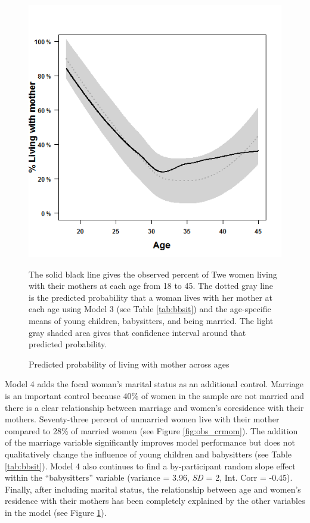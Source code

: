 \documentclass[10pt]{article}
\begin{document}
\begin{figure}[!tb]
    \centering
    \includegraphics[scale=.55]{images/babysit}
\caption{Predicted probability of living with mother across ages \label{fig:bbsit_fig} }
\medskip
The solid black line gives the observed percent of Twe women living with their mothers at each age from 18 to 45.  The dotted gray line is the predicted probability that a woman lives with her mother at each age using Model 3 (see Table \ref{tab:bbsit}) and the age-specific means of young children, babysitters, and being married.  The light gray shaded area gives that confidence interval around that predicted probability.
\end{figure}

Model 4 adds the focal woman's marital status as an additional control.  Marriage is an important control because 40\% of women in the sample are not married and there is a clear relationship between marriage and women's coresidence with their mothers.  Seventy-three percent of unmarried women live with their mother compared to 28\% of married women (see Figure \ref{fig:obs_crmom}).  The addition of the marriage variable significantly improves model performance but does not qualitatively change the influence of young children and babysitters  (see Table \ref{tab:bbsit}).  Model 4 also continues to find a by-participant random slope effect within the ``babysitters'' variable (variance = 3.96, \emph{SD} = 2, Int. Corr = -0.45).  Finally, after including marital status, the relationship between age and women's residence with their mothers has been completely explained by the other variables in the model (see Figure \ref{fig:bbsit_fig}).  
\end{document}
